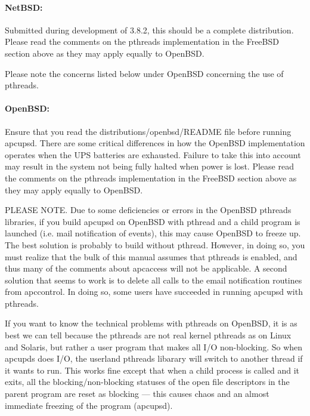 \paragraph*{NetBSD:}

\label{index-NetBSD-40}
\label{index-OS_002c-NetBSD-41}
Submitted during development of 3.8.2, this should be a complete distribution.
Please read the comments on the pthreads implementation in the FreeBSD
section above as they may apply equally to OpenBSD.  

Please note the concerns listed below under OpenBSD concerning the use of
pthreads. 

\label{OpenBSD}

\paragraph*{OpenBSD:}

\label{index-OpenBSD-42}
\label{index-OS_002c-OpenBSD-43}
Ensure that you read the distributions/openbsd/README file before running
apcupsd. There are some critical differences in how the OpenBSD implementation
operates when the UPS batteries are exhausted. Failure to take this into
account may result in the system not being fully halted when power is lost. 
Please read the comments on the pthreads implementation in the FreeBSD section
above as they may apply equally to OpenBSD.  

PLEASE NOTE. Due to some deficiencies or errors in the OpenBSD pthreads
libraries, if you build apcupsd on OpenBSD with pthread and a child program is
launched (i.e. mail notification of events), this may cause OpenBSD to freeze
up. The best solution is probably to build without pthread. However, in doing
so, you must realize that the bulk of this manual assumes that pthreads is
enabled, and thus many of the comments about apcaccess will not be applicable.
A second solution that seems to work is to delete all calls to the email
notification routines from apccontrol. In doing so, some users have succeeded
in running apcupsd with pthreads.  

If you want to know the technical problems with pthreads on OpenBSD, it is as
best we can tell because the pthreads are not real kernel pthreads as on Linux
and Solaris, but rather a user program that makes all I/O non-blocking. So
when apcupds does I/O, the userland pthreads libarary will switch to another
thread if it wants to run. This works fine except that when a child process is
called and it exits, all the blocking/non-blocking statuses of the open file
descriptors in the parent program are reset as blocking {---} this causes
chaos and an almost immediate freezing of the program (apcupsd). 

